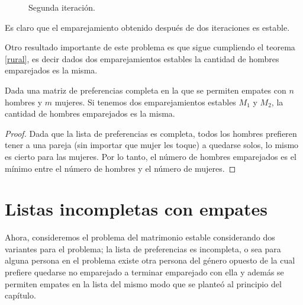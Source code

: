 \begin{eje}
\begin{figure}[H]

\caption{Segunda iteración.}
\end{figure}

Es claro que el emparejamiento obtenido después de dos iteraciones es estable.
\fin
\end{eje}

Otro resultado importante de este problema es que sigue cumpliendo el teorema \ref{rural}, es decir dados dos emparejamientos estables la cantidad de hombres emparejados es la misma.

\begin{cor}
Dada una matriz de preferencias completa en la que se permiten empates con $n$ hombres y $m$ mujeres. Si tenemos dos emparejamientos estables $M_1$ y $M_2$, la cantidad de hombres emparejados es la misma.
\end{cor}
\begin{proof}
Dada que la lista de preferencias es completa, todos los hombres prefieren tener a una pareja (sin importar que mujer les toque) a quedarse solos, lo mismo es cierto para las mujeres. Por lo tanto, el número de hombres emparejados es el mínimo entre el número de hombres y el número de mujeres. 
\end{proof}

\section{Listas incompletas con empates}
Ahora, consideremos el problema del matrimonio estable considerando dos variantes para el problema; la lista de preferencias es incompleta, o sea para alguna persona en el problema existe otra persona del género opuesto de la cual prefiere quedarse no emparejado a terminar emparejado con ella y además se permiten empates en la lista del mismo modo que se planteó al principio del capítulo. 

